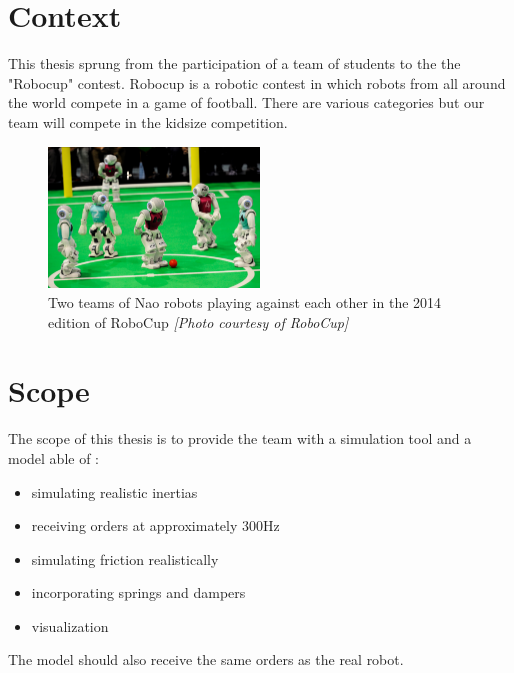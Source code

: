 \section{Context}
This thesis sprung from the participation of a team of students to the the "Robocup" contest. Robocup is a robotic contest in which robots from all around the world compete in a game of football. There are various categories but our team will compete in the kidsize competition.

\begin{figure}[htp]
\center
\includegraphics[width=0.5\textwidth]{figures/robocup}
\caption[Two teams of Nao robots playing against each other]{Two teams of Nao robots playing against each other in the 2014 edition of RoboCup \textit{[Photo courtesy of RoboCup]}}
\label{fig:intro_robocup}
\end{figure}

\section{Scope}
The scope of this thesis is to provide the team with a simulation tool and a model able of :
\begin{itemize}
\item simulating realistic inertias
\item receiving orders at approximately 300Hz
\item simulating friction realistically
\item incorporating springs and dampers
\item visualization
\end{itemize}

The model should also receive the same orders as the real robot.
